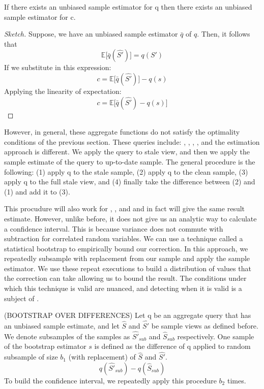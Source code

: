 \begin{lemma}\label{lemma:unbiased}
If there exists an unbiased sample estimator for q then there exists an unbiased sample estimator for c.
\end{lemma}

\begin{proof}[Sketch] Suppose, we have an unbiased sample estimator $\bar{q}$ of $q$. 
Then, it follows that \[\mathbb{E}\big[\bar{q}(\hat{S'})\big] = q(S')\]
If we substitute in this expression:
\[ c = \mathbb{E}\big[\bar{q}(\hat{S'})\big] -q(s) \] 
Applying the linearity of expectation:
\[ c = \mathbb{E}\big[\bar{q}(\hat{S'}) - q(s)\big] \]
\end{proof}

However, in general, these aggregate functions do not satisfy the optimality conditions of the previous section.
These queries include: \histfunc, \corrfunc, \varfunc, \covfunc, and the estimation approach is different.
We apply the query to stale view, and then we apply the sample estimate of the query to up-to-date sample. 
The general procedure is the following: (1) apply q to the stale sample, (2) apply q to the clean sample, (3) apply q to the full stale view, and (4) finally take the difference between (2) and (1) and add it to (3). 

This procudure will also work for \sumfunc, \countfunc, and \avgfunc and in fact will give the same result estimate.
However, unlike before, it does not give us an analytic way to calculate a confidence interval.
This is because variance does not commute with subtraction for correlated random variables.
We can use a technique called a statistical bootstrap \cite{AgarwalMPMMS13} to empirically bound our correction.
In this approach, we repeatedly subsample with replacement from our sample and apply the sample estimator.
We use these repeat executions to build a distribution of values that the correction can take allowing us to bound the result.
The conditions under which this technique is valid are nuanced, and detecting when it is valid is a subject of \cite{agarwalknowing}.

\begin{proposition} (BOOTSTRAP OVER DIFFERENCES) Let q be an aggregate query that has an unbiased sample estimate, and let $\hat{S}$ and $\hat{S'}$ be sample views as defined before. 
We denote subsamples of the samples as $\hat{S'}_{sub}$ and $\hat{S}_{sub}$ respectively.
One sample of the bootstrap estimator $s$ is defined as the difference of q applied to random subsample of size $b_1$ (with replacement) of $\hat{S}$ and $\hat{S'}$.
\[q(\hat{S'}_{sub}) - q(\hat{S}_{sub})\]
To build the confidence interval, we repeatedly apply this procedure $b_2$ times.
\end{proposition}

